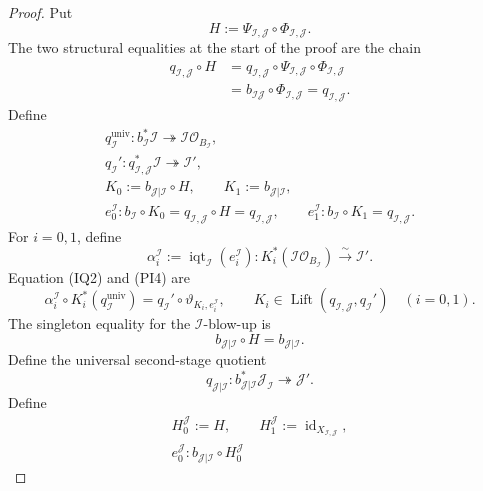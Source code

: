 \begin{proof}
  Put
  \[
    H:=\Psi_{\mathcal I,\mathcal J}\circ
      \Phi_{\mathcal I,\mathcal J}.
  \]
  The two structural equalities at the start of the proof are the chain
  \[
  \begin{aligned}
    q_{\mathcal I,\mathcal J}\circ H
      &=q_{\mathcal I,\mathcal J}\circ
          \Psi_{\mathcal I,\mathcal J}\circ
          \Phi_{\mathcal I,\mathcal J}\\
      &=b_{\mathcal I\mathcal J}\circ
          \Phi_{\mathcal I,\mathcal J}
       =q_{\mathcal I,\mathcal J}.
  \end{aligned}                                                    \tag{PI3}
  \]
  Define
  \[
  \begin{gathered}
    q_{\mathcal I}^{\mathrm{univ}}\colon
      b_{\mathcal I}^*\mathcal I
        \twoheadrightarrow\mathcal I\mathcal O_{B_{\mathcal I}},\\
    q_{\mathcal I}'\colon
      q_{\mathcal I,\mathcal J}^*\mathcal I
        \twoheadrightarrow\mathcal I',\\
    K_0:=b_{\mathcal J|\mathcal I}\circ H,
    \qquad K_1:=b_{\mathcal J|\mathcal I},\\
    e_0^{\mathcal I}\colon
      b_{\mathcal I}\circ K_0
       =q_{\mathcal I,\mathcal J}\circ H
       =q_{\mathcal I,\mathcal J},\qquad
    e_1^{\mathcal I}\colon
      b_{\mathcal I}\circ K_1=q_{\mathcal I,\mathcal J}.
  \end{gathered}                                                    \tag{PI4}
  \]
  For $i=0,1$, define
  \[
    \alpha_i^{\mathcal I}
      :=\operatorname{iqt}_{\mathcal I}(e_i^{\mathcal I})\colon
      K_i^*(\mathcal I\mathcal O_{B_{\mathcal I}})
        \xrightarrow{\sim}\mathcal I'.
  \]
  Equation (IQ2) and (PI4) are
  \[
    \alpha_i^{\mathcal I}\circ K_i^*(q_{\mathcal I}^{\mathrm{univ}})
      =q_{\mathcal I}'\circ\vartheta_{K_i,e_i^{\mathcal I}},
    \qquad
    K_i\in\operatorname{Lift}
      (q_{\mathcal I,\mathcal J},q_{\mathcal I}')\quad(i=0,1).   \tag{PI5}
  \]
  The singleton equality for the $\mathcal I$-blow-up is
  \[
    b_{\mathcal J|\mathcal I}\circ H=b_{\mathcal J|\mathcal I}.
  \]
  Define the universal second-stage quotient
  \[
    q_{\mathcal J|\mathcal I}\colon
      b_{\mathcal J|\mathcal I}^*\mathcal J_{\mathcal I}
      \twoheadrightarrow\mathcal J'.
  \]
  Define
  \[
  \begin{gathered}
    H_0^{\mathcal J}:=H,\qquad
    H_1^{\mathcal J}:=\operatorname{id}_{X_{\mathcal I,\mathcal J}},\\
    e_0^{\mathcal J}\colon
      b_{\mathcal J|\mathcal I}\circ H_0^{\mathcal J}

\end{gathered}\]
\end{proof}
